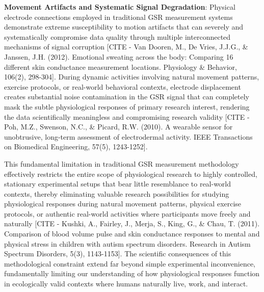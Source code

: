 \documentclass[12pt,a4paper]{report}
\begin{document}
\textbf{Movement Artifacts and Systematic Signal Degradation}: Physical electrode connections employed in traditional GSR
measurement systems demonstrate extreme susceptibility to motion artifacts that can severely and systematically
compromise data quality through multiple interconnected mechanisms of signal
corruption [CITE - Van Dooren, M., De Vries, J.J.G., \& Janssen, J.H. (2012). Emotional sweating across the body: Comparing 16 different skin conductance measurement locations. Physiology \& Behavior, 106(2), 298-304].
During dynamic activities involving natural movement patterns, exercise protocols, or real-world behavioral contexts,
electrode displacement creates substantial noise contamination in the GSR signal that can completely mask the subtle
physiological responses of primary research interest, rendering the data scientifically meaningless and compromising
research
validity [CITE - Poh, M.Z., Swenson, N.C., \& Picard, R.W. (2010). A wearable sensor for unobtrusive, long-term assessment of electrodermal activity. IEEE Transactions on Biomedical Engineering, 57(5), 1243-1252].

This fundamental limitation in traditional GSR measurement methodology effectively restricts the entire scope of
physiological research to highly controlled, stationary experimental setups that bear little resemblance to real-world
contexts, thereby eliminating valuable research possibilities for studying physiological responses during natural
movement patterns, physical exercise protocols, or authentic real-world activities where participants move freely and
naturally [CITE - Kushki, A., Fairley, J., Merja, S., King, G., \& Chau, T. (2011). Comparison of blood volume pulse and skin conductance responses to mental and physical stress in children with autism spectrum disorders. Research in Autism Spectrum Disorders, 5(3), 1143-1153].
The scientific consequences of this methodological constraint extend far beyond simple experimental inconvenience,
fundamentally limiting our understanding of how physiological responses function in ecologically valid contexts where
humans naturally live, work, and interact.
\end{document}
